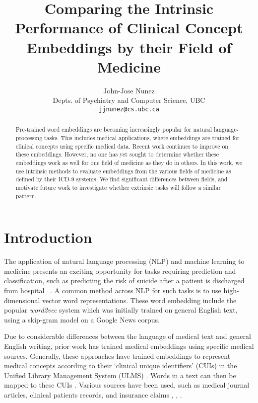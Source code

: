 \documentclass[11pt,a4paper]{article}
\title{Comparing the Intrinsic Performance of Clinical Concept Embeddings by their Field of Medicine}
\author{John-Jose Nunez\\
  Depts. of Psychiatry and Computer Science, UBC\\
  {\tt jjnunez@cs.ubc.ca} 
}
\date{}
\begin{document}
\maketitle
\begin{abstract}
	Pre-trained word embeddings are becoming increasingly popular for natural language-processing tasks. This includes medical applications, where embeddings are trained for clinical concepts using specific medical data. Recent work continues to improve on these embeddings. However, no one has yet sought to determine whether these embeddings work as well for one field of medicine as they do in others. In this work, we use intrinsic methods to evaluate embeddings from the various fields of medicine as defined by their ICD-9 systems. We find significant differences between fields, and motivate future work to investigate whether extrinsic tasks will follow a similar pattern. 
\end{abstract}

\section{Introduction}


The application of natural language processing (NLP) and machine learning to medicine presents an exciting opportunity for tasks requiring prediction and classification, such as predicting the risk of suicide after a patient is discharged from hospital ~\cite{mccoyImprovingPredictionSuicide2016}. A common method across NLP for such tasks is to use high-dimensional vector word representations. These word embedding include the popular \emph{word2vec} system \cite{mikolovEfficientEstimationWord2013} which was initially trained on general English text, using a skip-gram model on a Google News corpus.

Due to considerable differences between the language of medical text and general English writing, prior work has trained medical embeddings using specific medical sources. Generally, these approaches have trained embeddings to represent medical concepts according to their `clinical unique identifiers' (CUIs) in the Unified Library Management System (ULMS) \cite{bodenreiderUnifiedMedicalLanguage2004}. Words in a text can then be mapped to these CUIs \cite{yuShortIntroductionNILE2013}. Various sources have been used, such as medical journal articles, clinical patients records, and insurance claims \cite{devineMedicalSemanticSimilarity2014}, \cite{minarro-gimenezExploringApplicationDeep2014},  \cite{choiLearningLowDimensionalRepresentations2016}.  
\end{document}
